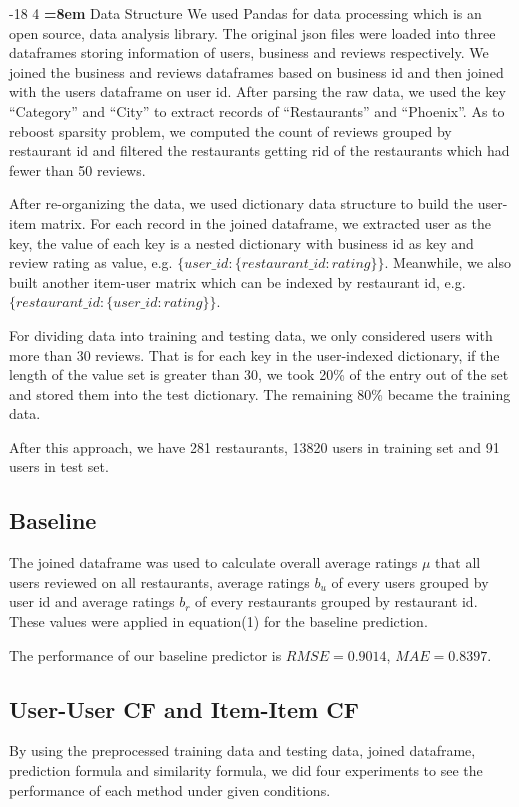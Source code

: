 \documentclass{llncs}
\makeatletter
\renewcommand\subsubsection{\@startsection{subsubsection}{3}{\z@}%
	{-18\p@ \@plus -4\p@ \@minus -4\p@}%
	{4\p@ \@plus 2\p@ \@minus 2\p@}%
	{\normalfont\normalsize\bfseries\boldmath
		\rightskip=\z@ \@plus 8em\pretolerance=10000 }}
\makeatother
\begin{document}
\subsubsection{Data Structure}
We used Pandas for data processing which is an open source, data analysis library. The original json files were loaded into three dataframes storing information of users, business and reviews respectively. We joined the business and reviews dataframes based on business id and then joined with the users dataframe on user id. After parsing the raw data, we used the key ``Category'' and ``City'' to extract records of ``Restaurants'' and ``Phoenix''. As to reboost sparsity problem, we computed the count of reviews grouped by restaurant id and filtered the restaurants getting rid of the restaurants which had fewer than 50 reviews. 

After re-organizing the data, we used dictionary data structure to build the user-item matrix. For each record in the joined dataframe, we extracted user as the key, the value of each key is a nested dictionary with business id as key and review rating as value, e.g. $\{user\_id: \{restaurant\_id: rating\}\}$. Meanwhile, we also built another item-user matrix which can be indexed by restaurant id, e.g. $\{restaurant\_id: \{user\_id: rating\}\}$.

For dividing data into training and testing data, we only considered users with more than 30 reviews. That is for each key in the user-indexed dictionary, if the length of the value set is greater than 30, we took 20\% of the entry out of the set and stored them into the test dictionary. The remaining 80\% became the training data. 

After this approach, we have 281 restaurants, 13820 users in training set and 91 users in test set.
\subsection{Baseline}
The joined dataframe was used to calculate overall average ratings $\mu$ that all users reviewed on all restaurants, average ratings $b_u$ of every users grouped by user id and average ratings $b_r$ of every restaurants grouped by restaurant id. These values were applied in equation(1) for the baseline prediction.

The performance of our baseline predictor is $RMSE = 0.9014 $, $MAE = 0.8397$.

\subsection{User-User CF and Item-Item CF}
By using the preprocessed training data and testing data, joined dataframe, prediction formula and similarity formula, we did four experiments to see the performance of each method under given conditions.   
\end{document}

